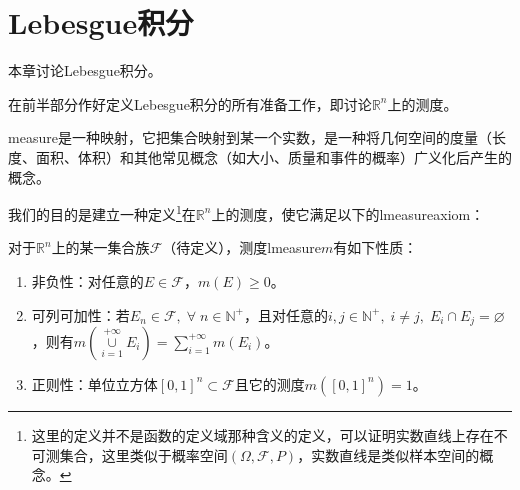 \chapter{Lebesgue积分}
本章讨论Lebesgue积分。\par
在前半部分作好定义Lebesgue积分的所有准备工作，即讨论$\mathbb{R}^n$上的测度。\par
\gls{measure}是一种映射，它把集合映射到某一个实数，是一种将几何空间的度量（长度、面积、体积）和其他常见概念（如大小、质量和事件的概率）广义化后产生的概念。\par
我们的目的是建立一种定义\footnote{这里的定义并不是函数的定义域那种含义的定义，可以证明实数直线上存在不可测集合，这里类似于概率空间$(\Omega,\mathcal{F},P)$，实数直线是类似样本空间的概念。}在$\mathbb{R}^n$上的测度，使它满足以下的\gls{lmeasureaxiom}：
\begin{axiom}\label{axi:Lebesguem}
	对于$\mathbb{R}^n$上的某一集合族$\mathcal{F}$（待定义\label{sec:lebesgue可测集合族}），测度\gls{lmeasure}$m$有如下性质：
	\begin{enumerate}
		\item 非负性：对任意的$ E\in\mathcal{F}$，$m(E)\geqslant0$。
		\item 可列可加性：若$E_n\in\mathcal{F},\;\forall\;n\in\mathbb{N}^+$，且对任意的$i,j\in\mathbb{N}^+,\;i\ne j,\;E_i\cap E_j=\varnothing$，则有$m(\underset{i=1}{\overset{+\infty}{\cup}} E_i)=\sum\limits_{i=1}^{+\infty}m(E_i)$。
		\item 正则性：单位立方体$[0,1]^n\subset\mathcal{F}$且它的测度$m([0,1]^n)=1$。
	\end{enumerate}
\end{axiom}

%



